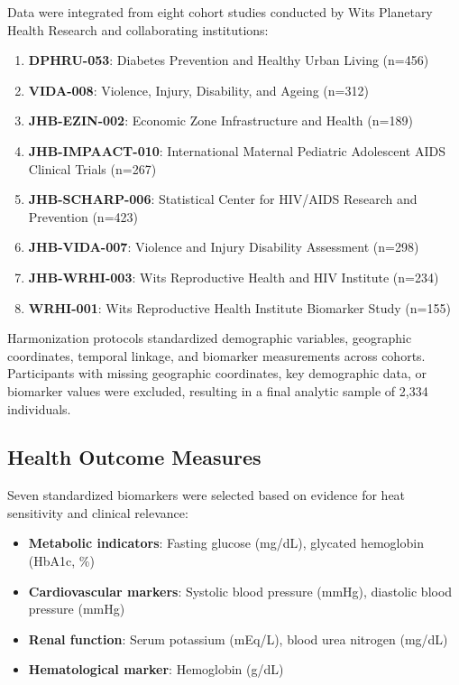 \documentclass[11pt,a4paper]{article}
\begin{document}
Data were integrated from eight cohort studies conducted by Wits Planetary Health Research and collaborating institutions:

\begin{enumerate}
\item \textbf{DPHRU-053}: Diabetes Prevention and Healthy Urban Living (n=456)
\item \textbf{VIDA-008}: Violence, Injury, Disability, and Ageing (n=312)  
\item \textbf{JHB-EZIN-002}: Economic Zone Infrastructure and Health (n=189)
\item \textbf{JHB-IMPAACT-010}: International Maternal Pediatric Adolescent AIDS Clinical Trials (n=267)
\item \textbf{JHB-SCHARP-006}: Statistical Center for HIV/AIDS Research and Prevention (n=423)
\item \textbf{JHB-VIDA-007}: Violence and Injury Disability Assessment (n=298)
\item \textbf{JHB-WRHI-003}: Wits Reproductive Health and HIV Institute (n=234)
\item \textbf{WRHI-001}: Wits Reproductive Health Institute Biomarker Study (n=155)
\end{enumerate}

Harmonization protocols standardized demographic variables, geographic coordinates, temporal linkage, and biomarker measurements across cohorts. Participants with missing geographic coordinates, key demographic data, or biomarker values were excluded, resulting in a final analytic sample of 2,334 individuals.

\subsection{Health Outcome Measures}

Seven standardized biomarkers were selected based on evidence for heat sensitivity and clinical relevance:

\begin{itemize}
\item \textbf{Metabolic indicators}: Fasting glucose (mg/dL), glycated hemoglobin (HbA1c, \%)
\item \textbf{Cardiovascular markers}: Systolic blood pressure (mmHg), diastolic blood pressure (mmHg)
\item \textbf{Renal function}: Serum potassium (mEq/L), blood urea nitrogen (mg/dL)
\item \textbf{Hematological marker}: Hemoglobin (g/dL)
\end{itemize}
\end{document}
